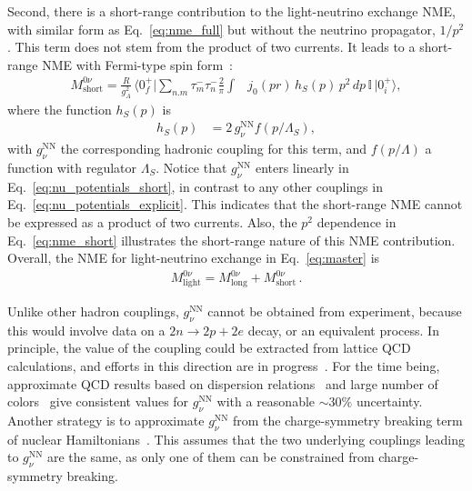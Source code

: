 Second, there is a short-range contribution to the light-neutrino exchange NME, with similar form as Eq.~\eqref{eq:nme_full} but without the neutrino propagator, $1/p^2$. This term does not stem from the product of two currents. It leads to a short-range NME with Fermi-type spin form~\cite{Cirigliano:2019vdj}:
\begin{align}
\label{eq:nme_short}
  M^{0\nu}_\text{short} = \frac{R}{g_A^2}\,
  \langle 0^+_f\rvert
  \sum_{n.m}
  \tau^-_m\tau^-_n \frac{2}{\pi}\int
    &j_0(pr)\,h_S(p)\,p^2\,d p\,\mathbb{I}\,
  \lvert 0^+_i\rangle, %
\end{align}
where the function $h_S(p)$ is
\begin{align}
\label{eq:nu_potentials_short}
h_{S}(p)&=2\,g^\text{NN}_\nu f(p/\Lambda_S),
\end{align}
with $g^\text{NN}_\nu$ the corresponding hadronic coupling for this term, and $f(p/\Lambda)$ a function with regulator $\Lambda_S$. Notice that $g^\text{NN}_\nu$ enters linearly in Eq.~\eqref{eq:nu_potentials_short}, in contrast to  any other couplings in  Eq.~\eqref{eq:nu_potentials_explicit}. This indicates that the short-range NME cannot be expressed as a product of two currents. Also, the $p^2$ dependence in Eq.~\eqref{eq:nme_short} illustrates the short-range nature of this NME contribution. Overall, the NME for light-neutrino exchange in Eq.~\eqref{eq:master} is
\begin{align}
M^{0\nu}_\text{light}=M^{0\nu}_\text{long}+M^{0\nu}_\text{short}\,.
\label{eq:nme_total}
\end{align}

Unlike other hadron couplings, $g^\text{NN}_\nu$ cannot be obtained from experiment, because this would involve data on a $2n\rightarrow2p+2e$ decay, or an equivalent process. In principle, the value of the coupling could be extracted from lattice QCD calculations, and efforts in this direction are in progress~\cite{Davoudi:2020gxs,Davoudi:2021noh}. For the time being, approximate QCD results based on dispersion relations~\cite{Cirigliano:2020dmx,Cirigliano:2021qko} and large number of colors~\cite{Richardson:2021xiu} give consistent values for $g^\text{NN}_\nu$ with a reasonable $\sim30\%$ uncertainty. Another strategy is to approximate $g^\text{NN}_\nu$ from the charge-symmetry breaking term of nuclear Hamiltonians~\cite{Cirigliano:2019vdj}. This assumes that the two underlying couplings leading to $g^\text{NN}_\nu$ are the same, as only one of them can be constrained from charge-symmetry breaking.


